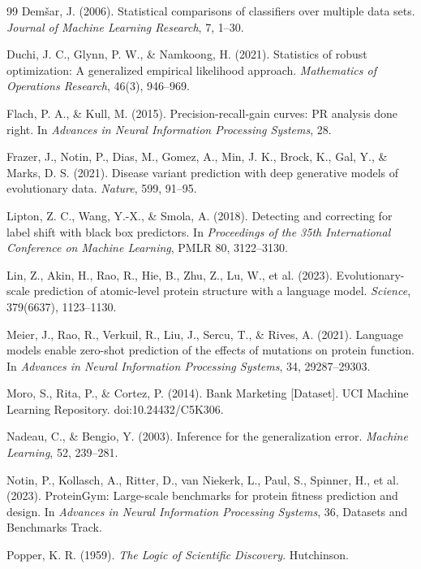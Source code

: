 \documentclass[11pt]{article}
\theoremstyle{remark}
\begin{document}
\begin{thebibliography}{99}
Dem\v{s}ar, J. (2006).
Statistical comparisons of classifiers over multiple data sets.
\emph{Journal of Machine Learning Research}, 7, 1--30.

Duchi, J. C., Glynn, P. W., \& Namkoong, H. (2021).
Statistics of robust optimization: A generalized empirical likelihood approach.
\emph{Mathematics of Operations Research}, 46(3), 946--969.

Flach, P. A., \& Kull, M. (2015).
Precision-recall-gain curves: PR analysis done right.
In \emph{Advances in Neural Information Processing Systems}, 28.

Frazer, J., Notin, P., Dias, M., Gomez, A., Min, J. K., Brock, K., Gal, Y., \& Marks, D. S. (2021).
Disease variant prediction with deep generative models of evolutionary data.
\emph{Nature}, 599, 91--95.

Lipton, Z. C., Wang, Y.-X., \& Smola, A. (2018).
Detecting and correcting for label shift with black box predictors.
In \emph{Proceedings of the 35th International Conference on Machine Learning}, PMLR 80, 3122--3130.

Lin, Z., Akin, H., Rao, R., Hie, B., Zhu, Z., Lu, W., et al. (2023).
Evolutionary-scale prediction of atomic-level protein structure with a language model.
\emph{Science}, 379(6637), 1123--1130.

Meier, J., Rao, R., Verkuil, R., Liu, J., Sercu, T., \& Rives, A. (2021).
Language models enable zero-shot prediction of the effects of mutations on protein function.
In \emph{Advances in Neural Information Processing Systems}, 34, 29287--29303.

Moro, S., Rita, P., \& Cortez, P. (2014).
Bank Marketing [Dataset].
UCI Machine Learning Repository. doi:10.24432/C5K306.

Nadeau, C., \& Bengio, Y. (2003).
Inference for the generalization error.
\emph{Machine Learning}, 52, 239--281.

Notin, P., Kollasch, A., Ritter, D., van Niekerk, L., Paul, S., Spinner, H., et al. (2023).
ProteinGym: Large-scale benchmarks for protein fitness prediction and design.
In \emph{Advances in Neural Information Processing Systems}, 36, Datasets and Benchmarks Track.

Popper, K. R. (1959).
\emph{The Logic of Scientific Discovery}.
Hutchinson.


\end{thebibliography}
\end{document}
